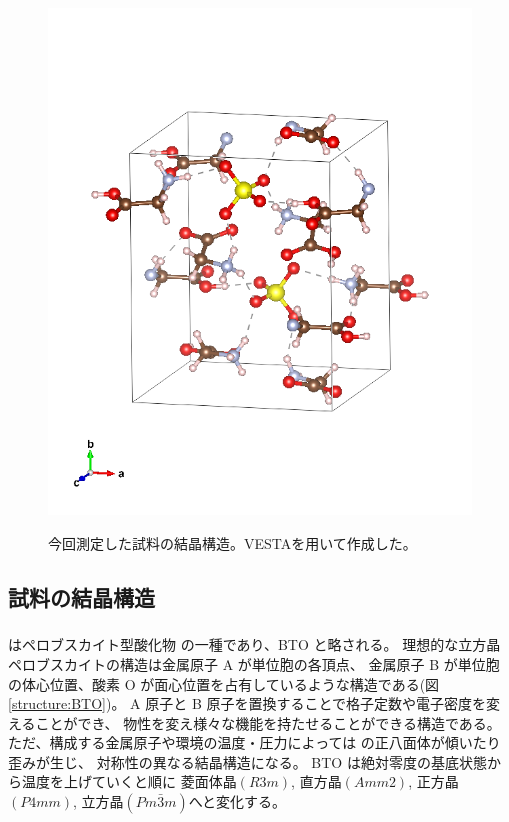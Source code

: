 \documentclass[9pt,dvipdfmx,a4paper]{jsarticle}
\begin{document}
\begin{figure}[H]
\begin{minipage}[t]{0.48\columnwidth}
        \includegraphics[width = \columnwidth]{TGS.png}
        \label{structure:TGS}
    \end{minipage}
    \caption{今回測定した試料の結晶構造。VESTA\cite{VESTA}を用いて作成した。}
\end{figure}

\subsection{試料の結晶構造}
\subsubsection*{}
 はペロブスカイト型酸化物  の一種であり、BTO と略される。
理想的な立方晶ペロブスカイトの構造は金属原子 A が単位胞の各頂点、
金属原子 B が単位胞の体心位置、酸素 O が面心位置を占有しているような構造である(図\ref{structure:BTO})。
A 原子と B 原子を置換することで格子定数や電子密度を変えることができ、
物性を変え様々な機能を持たせることができる構造である。
ただ、構成する金属原子や環境の温度・圧力によっては  の正八面体が傾いたり歪みが生じ、
対称性の異なる結晶構造になる。
BTO は絶対零度の基底状態から温度を上げていくと順に
菱面体晶$(R3m)$, 直方晶$(Amm2)$,
正方晶$(P4mm)$,
立方晶$(Pm\bar{3}m)$へと変化する。
\end{document}
